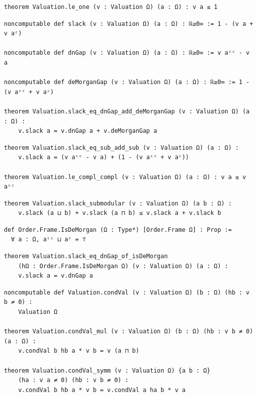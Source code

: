 \label{lean:valuation-le-one}
\begin{lstlisting}
theorem Valuation.le_one (v : Valuation Ω) (a : Ω) : v a ≤ 1
\end{lstlisting}

\label{lean:valuation-slack-eq-dngap-add-demorgangap}
\begin{lstlisting}
noncomputable def slack (v : Valuation Ω) (a : Ω) : ℝ≥0∞ := 1 - (v a + v aᶜ)

noncomputable def dnGap (v : Valuation Ω) (a : Ω) : ℝ≥0∞ := v aᶜᶜ - v a

noncomputable def deMorganGap (v : Valuation Ω) (a : Ω) : ℝ≥0∞ := 1 - (v aᶜᶜ + v aᶜ)

theorem Valuation.slack_eq_dnGap_add_deMorganGap (v : Valuation Ω) (a : Ω) :
    v.slack a = v.dnGap a + v.deMorganGap a
\end{lstlisting}

\label{lean:valuation-slack-eq-sub-add-sub}
\begin{lstlisting}
theorem Valuation.slack_eq_sub_add_sub (v : Valuation Ω) (a : Ω) :
    v.slack a = (v aᶜᶜ - v a) + (1 - (v aᶜᶜ + v aᶜ))

theorem Valuation.le_compl_compl (v : Valuation Ω) (a : Ω) : v a ≤ v aᶜᶜ
\end{lstlisting}

\label{lean:valuation-slack-submodular}
\begin{lstlisting}
theorem Valuation.slack_submodular (v : Valuation Ω) (a b : Ω) :
    v.slack (a ⊔ b) + v.slack (a ⊓ b) ≤ v.slack a + v.slack b
\end{lstlisting}

\label{lean:isdemorgan}
\begin{lstlisting}
def Order.Frame.IsDeMorgan (Ω : Type*) [Order.Frame Ω] : Prop :=
  ∀ a : Ω, aᶜᶜ ⊔ aᶜ = ⊤
\end{lstlisting}

\label{lean:valuation-slack-eq-dngap-of-isdemorgan}
\begin{lstlisting}
theorem Valuation.slack_eq_dnGap_of_isDeMorgan
    (hΩ : Order.Frame.IsDeMorgan Ω) (v : Valuation Ω) (a : Ω) :
    v.slack a = v.dnGap a
\end{lstlisting}

\label{lean:condval-mul}
\begin{lstlisting}
noncomputable def Valuation.condVal (v : Valuation Ω) (b : Ω) (hb : v b ≠ 0) :
    Valuation Ω

theorem Valuation.condVal_mul (v : Valuation Ω) (b : Ω) (hb : v b ≠ 0) (a : Ω) :
    v.condVal b hb a * v b = v (a ⊓ b)

theorem Valuation.condVal_symm (v : Valuation Ω) {a b : Ω}
    (ha : v a ≠ 0) (hb : v b ≠ 0) :
    v.condVal b hb a * v b = v.condVal a ha b * v a
\end{lstlisting}

